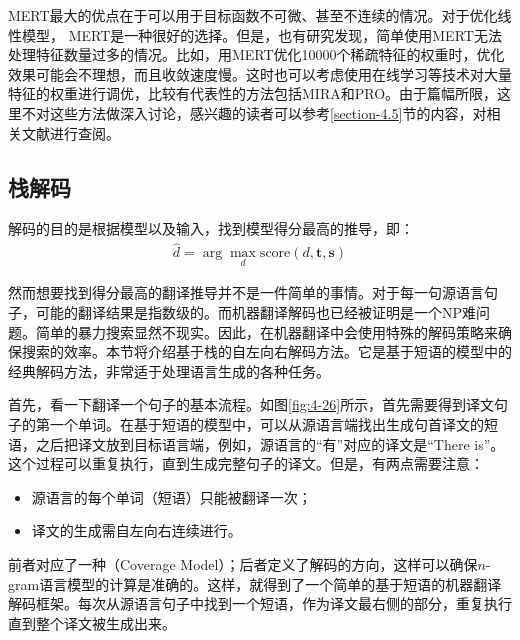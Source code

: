\parinterval MERT最大的优点在于可以用于目标函数不可微、甚至不连续的情况。对于优化线性模型， MERT是一种很好的选择。但是，也有研究发现，简单使用MERT无法处理特征数量过多的情况。比如，用MERT优化10000个稀疏特征的权重时，优化效果可能会不理想，而且收敛速度慢。这时也可以考虑使用在线学习等技术对大量特征的权重进行调优，比较有代表性的方法包括MIRA\cite{DBLP:conf/emnlp/ChiangMR08}和PRO\cite{Hopkins2011Tuning}。由于篇幅所限，这里不对这些方法做深入讨论，感兴趣的读者可以参考\ref{section-4.5}节的内容，对相关文献进行查阅。


\subsection{栈解码}

\parinterval 解码的目的是根据模型以及输入，找到模型得分最高的推导，即：
\begin{eqnarray}
\hat{d} = \arg\max_{d} \textrm{score}(d,\mathbf{t},\mathbf{s})
\label{eq:4-21}
\end{eqnarray}

\parinterval 然而想要找到得分最高的翻译推导并不是一件简单的事情。对于每一句源语言句子，可能的翻译结果是指数级的。而机器翻译解码也已经被证明是一个NP难问题\cite{knight1999decoding}。简单的暴力搜索显然不现实。因此，在机器翻译中会使用特殊的解码策略来确保搜索的效率。本节将介绍基于栈的自左向右解码方法。它是基于短语的模型中的经典解码方法，非常适于处理语言生成的各种任务。

\parinterval 首先，看一下翻译一个句子的基本流程。如图\ref{fig:4-26}所示，首先需要得到译文句子的第一个单词。在基于短语的模型中，可以从源语言端找出生成句首译文的短语，之后把译文放到目标语言端，例如，源语言的``有''对应的译文是``There is''。这个过程可以重复执行，直到生成完整句子的译文。但是，有两点需要注意：

\begin{itemize}
\vspace{0.5em}
\item 源语言的每个单词（短语）只能被翻译一次；
\vspace{0.5em}
\item 译文的生成需自左向右连续进行。
\vspace{0.5em}
\end{itemize}

\parinterval 前者对应了一种{\small{}}（Coverage Model）；后者定义了解码的方向，这样可以确保$n$-gram语言模型的计算是准确的。这样，就得到了一个简单的基于短语的机器翻译解码框架。每次从源语言句子中找到一个短语，作为译文最右侧的部分，重复执行直到整个译文被生成出来。

